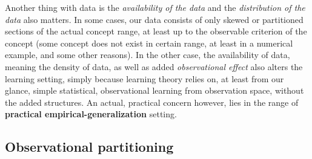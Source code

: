 Another thing with data is the \textit{availability of the data} and the \textit{distribution of the data} also matters. In some cases, our data consists of only skewed or partitioned sections of the actual concept range, at least up to the observable criterion of the concept (some concept does not exist in certain range, at least in a numerical example, and some other reasons). In the other case, the availability of data, meaning the density of data, as well as added \textit{observational effect} also alters the learning setting, simply because learning theory relies on, at least from our glance, simple statistical, observational learning from observation space, without the added structures. An actual, practical concern however, lies in the range of \textbf{practical empirical-generalization} setting. 
\subsection{Observational partitioning}

